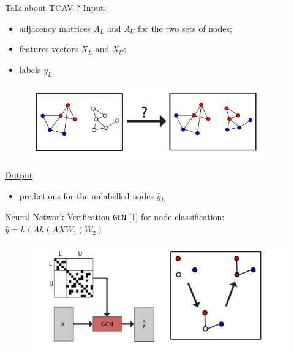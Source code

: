 \documentclass[final]{beamer}
\begin{document}
\begin{frame}[fragile]{}
\begin{textblock}{\colwidth}
\begin{paddedBlock}{Talk about TCAV ?}
\underline{Input}:
\begin{itemize}
\item adjacency matrices $A_L$ and $A_U$ for the two sets of nodes;
\item features vectors $X_L$ and $X_U$;
\item labels $y_L$
\end{itemize}
\begin{figure}
    \centering
    \includegraphics[width=0.90\textwidth]{img/graph_prob.pdf}
    \label{fig:coins}
\end{figure}
\underline{Output}:
\begin{itemize}
	\item predictions for the unlabelled nodes $\hat{y}_L$
\end{itemize}
\end{paddedBlock}

\begin{paddedBlock}{Neural Network Verification}
\texttt{GCN} [1] for node classification: $\hat{y} = h(Ah(AXW_1)W_2)$
\begin{figure}
    \centering
    \includegraphics[width=.8\textwidth]{img/model_small.pdf}
    \label{fig:small}
\end{figure}
\end{paddedBlock}
\end{textblock}


\end{frame}
\end{document}
